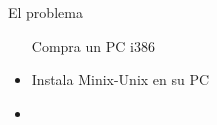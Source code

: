 \documentclass[hyperref={colorlinks}]{beamer}
\begin{document}
\begin{frame}
\begin{minipage}{.55\linewidth}
\begin{block}{El problema}
\begin{itemize}
                    \begin{minipage}{.8\linewidth} Compra un PC i386 \end{minipage}
                    \pause
                \item
                    \begin{minipage}{.1\linewidth}  \end{minipage}
                    \begin{minipage}{.8\linewidth} Instala Minix-Unix en su PC \end{minipage}
                    \pause
                \item
                    \begin{minipage}{.1\linewidth}  \end{minipage}

\end{itemize}
\end{block}
\end{minipage}
\end{frame}
\end{document}
